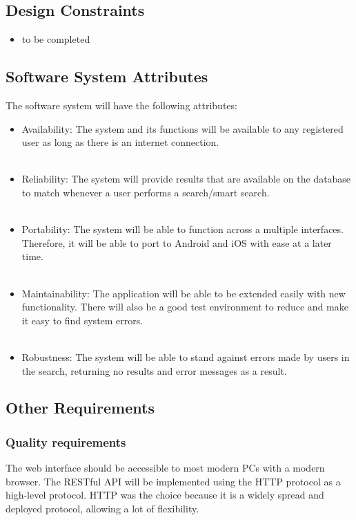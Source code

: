 \documentclass[a4paper,10pt]{article}
\begin{document}
	\subsection{Design Constraints}
	\begin{itemize}
		\item to be completed
	\end{itemize}

	\subsection{Software System Attributes}
	The software system will have the following attributes:
		\begin{itemize}
		\item Availability: The system and its functions will be available to any registered user as long as there is an internet connection. 
\\\\
		\item Reliability: The system will provide results that are available on the database to match whenever a user performs a search/smart search.
\\\\
		\item Portability: The system will be able to function across a multiple interfaces. Therefore, it will be able to port to Android and iOS with ease at a later time. 
\\\\
		\item Maintainability: The application will be able to be extended easily with new functionality. There will also be a good test environment to reduce and make it easy to find system errors.  
\\\\
		\item Robustness: The system will be able to stand against errors made by users in the search, returning no results and error messages as a result.
		\end{itemize}
        
	\subsection{Other Requirements}

\subsubsection{Quality requirements}
The web interface should be accessible to most modern PCs with a modern browser.
The RESTful API will be implemented using the HTTP protocol as a high-level protocol. HTTP was the choice because it is a widely spread and deployed protocol, allowing a lot of flexibility. 
\end{document}
